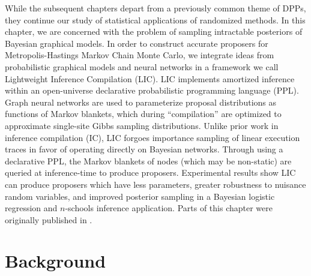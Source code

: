 \documentclass[../../thesis.tex]{subfiles}
\begin{document}
While the subsequent chapters depart from a previously common theme of DPPs,
they continue our study of statistical applications of randomized methods.
In this chapter,
we are concerned with the problem of sampling intractable posteriors of
Bayesian graphical models.
In order to construct accurate proposers for Metropolis-Hastings Markov
Chain Monte Carlo, we integrate ideas from probabilistic graphical models
and neural networks in a framework we call Lightweight
Inference Compilation (LIC). LIC implements amortized inference within an
open-universe declarative probabilistic programming language (PPL).
Graph neural networks are used to parameterize proposal distributions
as functions of Markov blankets, which during ``compilation'' are optimized
to approximate single-site Gibbs sampling distributions. Unlike prior work
in inference compilation (IC), LIC forgoes importance sampling of linear
execution traces in favor of operating directly on Bayesian networks.
Through using a declarative PPL, the Markov blankets of nodes (which may be
non-static) are queried at inference-time to produce proposers. Experimental
results show LIC can produce proposers which have less parameters, greater
robustness to nuisance random variables, and improved posterior sampling in
a Bayesian logistic regression and $n$-schools inference application.
Parts of this chapter were originally published in
.

\section{Background}
\end{document}

